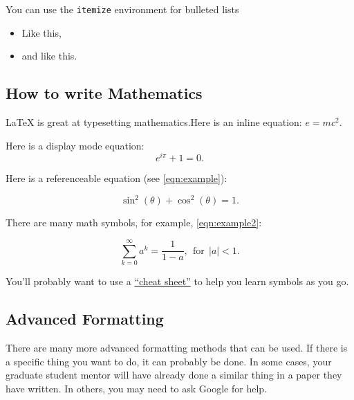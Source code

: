 \documentclass[11pt,twocolumn]{article}
\begin{document}
You can use the \verb|itemize| environment for bulleted lists

\begin{itemize}
	\item Like this,
	\item and like this.
\end{itemize}

\subsection{How to write Mathematics}

\LaTeX{} is great at typesetting mathematics.Here is an inline equation: \(e = mc^2\).

Here is a display mode equation: \[e^{i \pi} + 1 = 0.\]

Here is a referenceable equation (see \cref{eqn:example}):

\begin{equation}
	\label{eqn:example}
	\sin^2(\theta) + \cos^2(\theta) = 1.
\end{equation}

There are many math symbols, for example, \cref{eqn:example2}:

\begin{equation}
	\label{eqn:example2}
	\sum_{k=0}^\infty a^k = \frac{1}{1-a}, \mathrm{~~for~~} |a| < 1.
\end{equation}

You'll probably want to use a \href{https://www.rpi.edu/dept/arc/training/latex/LaTeX_symbols.pdf}{``cheat sheet''} to help you learn symbols as you go.

\subsection{Advanced Formatting}
There are many more advanced formatting methods that can be used.  If there is a specific thing you want to do, it can probably be done.  In some cases, your graduate student mentor will have already done a similar thing in a paper they have written.  In others, you may need to ask Google for help.
\end{document}
